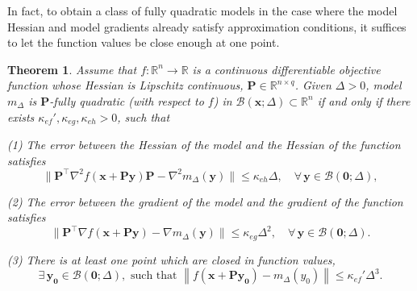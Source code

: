 \documentclass[colorlinks=true, linkcolor=blue, citecolor=blue, urlcolor=blue]{article}
\theoremstyle{plain}
\newtheorem{theorem}{Theorem}[section]
\theoremstyle{definition}
\theoremstyle{remark}
\newcommand{\RR}{\mathbb{R}}
\newcommand{\ul}{\boldsymbol}
\newcommand{\ml}{\boldsymbol}
\newcommand{\norm}[1]{\left\lVert#1\right\rVert}
\begin{document}
In fact, to obtain a class of fully quadratic models in the case where the model Hessian and model gradients already satisfy approximation conditions, it suffices to let the function values be close enough at one point.

\begin{theorem}\label{theorempre}
    Assume that $f: \RR^n \rightarrow \RR$ is a continuous differentiable objective function whose Hessian is Lipschitz continuous, $\bm P \in \RR^{n \times q}$. Given $\Delta > 0$, model $m_{\Delta}$ is $\ml{P}$-fully quadratic (with respect to $f$) in $\mathcal{B}(\bm x;\Delta)\subset \RR^n$ if and only if there exists $\kappa_{ef}', \kappa_{eg}, \kappa_{eh} > 0$, such that 

    (1) The error between the Hessian of the model and the Hessian of the function satisfies
    $$
    \|\ml{P}^{\top} \nabla^2 f(\ul{x + P y}) \ml{P} -\nabla^2 m_{\Delta}(\ul{y})\| \leq \kappa_{eh} \Delta, \quad \forall \,   \ul{y} \in \mathcal{B}(\ul{0} ; \Delta),
    $$

    (2) The error between the gradient of the model and the gradient of the function satisfies
    $$
    \|\ml{P}^{\top} \nabla f(\ul{x + P y})-\nabla m_{\Delta}(\ul{y})\| \leq \kappa_{e g} \Delta^2, \quad \forall \,   \ul{y} \in \mathcal{B}(\ul{0} ; \Delta).
    $$

    (3) There is at least one point which are closed in function values,
    $$
        \exists\,  \ul{y_0} \in \mathcal{B}(\ul{0}; \Delta), \text{ such that } \norm{f(\ul{x} + \ml{P}\ul{y_0}) - m_{\Delta} (y_0)} \leq \kappa_{ef}'\Delta^3.
    $$
\end{theorem}
\end{document}
